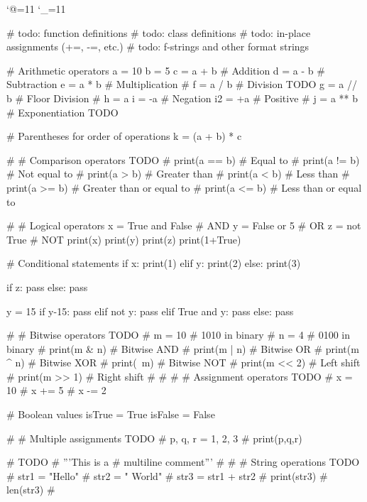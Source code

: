 \let\e\expandafter
\catcode`@=11
\catcode`_=11

\def\@pytexError#1{%
	\errmessage{#1}%
}









\def\@pytexChar@DoubleQuote{\relax}
\def\@pytexChar@SingleQuote{\relax}

\let\@pytexPrevBeginMacro\begin
\def\begin#1{%
	\def\@pytexTMP{#1}%
	\ifx\@pytexTMP\STR_python%
		\@pytexTokeniser@begin%
	\else%
		\@pytexPrevBeginMacro{#1}%
	\fi%
}


\loggingall
\begin{python}

# todo: function definitions
# todo: class definitions
# todo: in-place assignments (+=, -=, etc.)
# todo: f-strings and other format strings


# Arithmetic operators
a = 10
b = 5
c = a + b  # Addition
d = a - b  # Subtraction
e = a * b  # Multiplication
# f = a / b  # Division TODO
g = a // b # Floor Division
# h = a %
i = -a     # Negation
i2 = +a    # Positive
# j = a ** b # Exponentiation TODO


# Parentheses for order of operations
k = (a + b) * c

# # Comparison operators TODO
# print(a == b)  # Equal to
# print(a != b)  # Not equal to
# print(a > b)   # Greater than
# print(a < b)   # Less than
# print(a >= b)  # Greater than or equal to
# print(a <= b)  # Less than or equal to


# # Logical operators
x = True and False  # AND
y = False or 5      # OR
z = not True        # NOT
print(x)
print(y)
print(z)
print(1+True)

# Conditional statements
if x:
    print(1)
elif y:
    print(2)
else:
    print(3)

\end{python}
\begin{python}

if z:
    pass
else:
    pass

y = 15
if y-15:
    pass
elif not y:
	pass
elif True and y:
    pass
else:
    pass


# # Bitwise operators TODO
# m = 10  # 1010 in binary
# n = 4   # 0100 in binary
# print(m & n)  # Bitwise AND
# print(m | n)  # Bitwise OR
# print(m ^ n)  # Bitwise XOR
# print(~m)   # Bitwise NOT
# print(m << 2) # Left shift
# print(m >> 1) # Right shift
# 
# 
# # Assignment operators TODO
# x = 10
# x += 5
# x -= 2

# Boolean values
isTrue = True
isFalse = False

# # Multiple assignments TODO
# p, q, r = 1, 2, 3
# print(p,q,r)

# TODO
# '''This is a
# multiline comment'''
# 
# 
# String operations TODO
# str1 = "Hello"
# str2 = " World"
# str3 = str1 + str2
# print(str3)
# len(str3)
# 

\end{python} %

\bye
